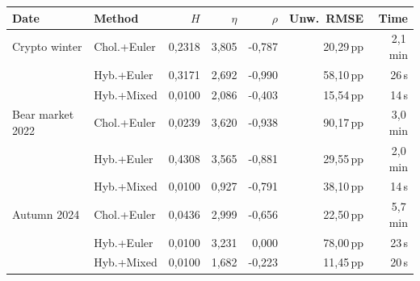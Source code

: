 \begin{tabular}{l l r r r r r}
  \toprule
  \textbf{Date} & \textbf{Method} & \textbf{$H$} & \textbf{$\eta$} & \textbf{$\rho$} & \textbf{Unw.\ RMSE} & \textbf{Time} \\
  \midrule
  Crypto winter & Chol.+Euler & 0,2318 & 3,805 & -0,787 & 20,29\,pp & 2,1\,min \\
   & Hyb.+Euler & 0,3171 & 2,692 & -0,990 & 58,10\,pp & 26\,s \\
   & Hyb.+Mixed & 0,0100 & 2,086 & -0,403 & 15,54\,pp & 14\,s \\
  \addlinespace[3pt]
  Bear market 2022 & Chol.+Euler & 0,0239 & 3,620 & -0,938 & 90,17\,pp & 3,0\,min \\
   & Hyb.+Euler & 0,4308 & 3,565 & -0,881 & 29,55\,pp & 2,0\,min \\
   & Hyb.+Mixed & 0,0100 & 0,927 & -0,791 & 38,10\,pp & 14\,s \\
  \addlinespace[3pt]
  Autumn 2024 & Chol.+Euler & 0,0436 & 2,999 & -0,656 & 22,50\,pp & 5,7\,min \\
   & Hyb.+Euler & 0,0100 & 3,231 & 0,000 & 78,00\,pp & 23\,s \\
   & Hyb.+Mixed & 0,0100 & 1,682 & -0,223 & 11,45\,pp & 20\,s \\
  \bottomrule
\end{tabular}